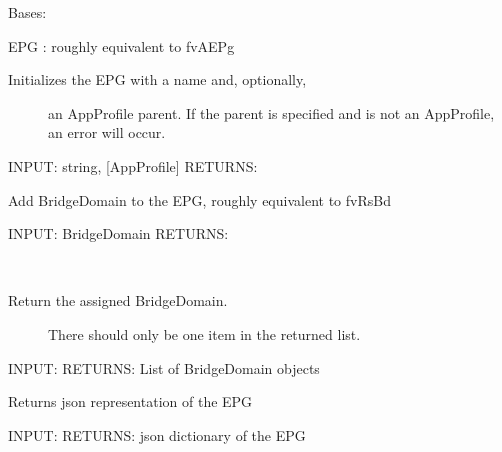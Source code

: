 \documentclass[letterpaper,10pt,english]{sphinxmanual}
\begin{document}
\begin{fulllineitems}
\label{acitoolkit:acitoolkit.EPG}
Bases: {\hyperref[acitoolkit:acitoolkit.CommonEPG]{}}

EPG :  roughly equivalent to fvAEPg
\begin{description}
\item[{Initializes the EPG with a name and, optionally,}] \leavevmode
an AppProfile parent.
If the parent is specified and is not an AppProfile,
an error will occur.

\end{description}

INPUT: string, {[}AppProfile{]}
RETURNS:

\begin{fulllineitems}
\label{acitoolkit:acitoolkit.EPG.add_bd}
Add BridgeDomain to the EPG, roughly equivalent to fvRsBd

INPUT: BridgeDomain
RETURNS:

\end{fulllineitems}


\begin{fulllineitems}
\label{acitoolkit:acitoolkit.EPG.get_bd}~\begin{description}
\item[{Return the assigned BridgeDomain.}] \leavevmode
There should only be one item in the returned list.

\end{description}

INPUT:
RETURNS: List of BridgeDomain objects

\end{fulllineitems}


\begin{fulllineitems}
\label{acitoolkit:acitoolkit.EPG.get_json}
Returns json representation of the EPG

INPUT:
RETURNS: json dictionary of the EPG

\end{fulllineitems}


\end{fulllineitems}
\end{document}
